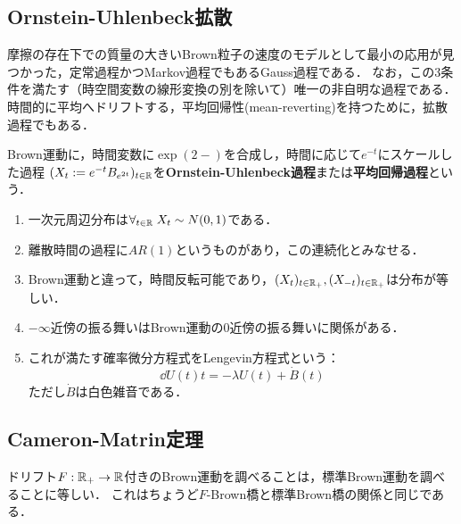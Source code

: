\documentclass[uplatex,dvipdfmx]{jsreport}
\begin{document}
\subsection{Ornstein-Uhlenbeck拡散}

\begin{tcolorbox}[colframe=ForestGreen, colback=ForestGreen!10!white,breakable,colbacktitle=ForestGreen!40!white,coltitle=black,fonttitle=\bfseries\sffamily,
title=]
    摩擦の存在下での質量の大きいBrown粒子の速度のモデルとして最小の応用が見つかった，定常過程かつMarkov過程でもあるGauss過程である．
    なお，この3条件を満たす（時空間変数の線形変換の別を除いて）唯一の非自明な過程である．
    時間的に平均へドリフトする，平均回帰性(mean-reverting)を持つために，拡散過程でもある．
\end{tcolorbox}

\begin{definition}
    Brown運動に，時間変数に$\exp(2-)$を合成し，時間に応じて$e^{-t}$にスケールした過程
    $(X_t:=e^{-t}B_{e^{2t}})_{t\in\mathbb{R}}$を\textbf{Ornstein-Uhlenbeck過程}または\textbf{平均回帰過程}という．
\end{definition}
\begin{remarks}\mbox{}
    \begin{enumerate}
        \item 一次元周辺分布は$\forall_{t\in\mathbb{R}}\;X_t\sim N(0,1)$である．
        \item 離散時間の過程に$AR(1)$というものがあり，この連続化とみなせる．
        \item Brown運動と違って，時間反転可能であり，$(X_t)_{t\in\mathbb{R}_+},(X_{-t})_{t\in\mathbb{R}_+}$は分布が等しい．
        \item $-\infty$近傍の振る舞いはBrown運動の$0$近傍の振る舞いに関係がある．
        \item これが満たす確率微分方程式をLengevin方程式という：
        \[\dd{U(t)}{t}=-\lambda U(t)+\dot{B}(t)\]
        ただし$\dot{B}$は白色雑音である．
    \end{enumerate}
\end{remarks}

\subsection{Cameron-Matrin定理}

\begin{tcolorbox}[colframe=ForestGreen, colback=ForestGreen!10!white,breakable,colbacktitle=ForestGreen!40!white,coltitle=black,fonttitle=\bfseries\sffamily,
title=]
    ドリフト$F:\mathbb{R}_+\to\mathbb{R}$付きのBrown運動を調べることは，標準Brown運動を調べることに等しい．
    これはちょうど$F$-Brown橋と標準Brown橋の関係と同じである．
\end{tcolorbox}
\end{document}
